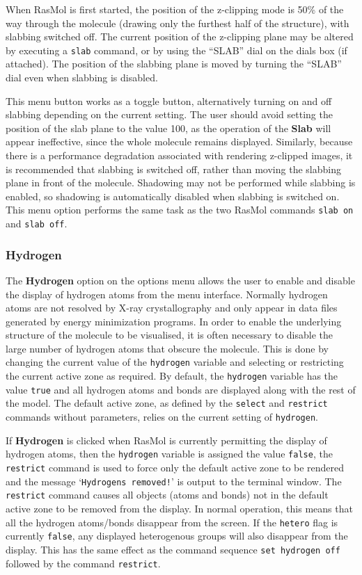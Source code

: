 When RasMol is first started, the position of the z-clipping mode is 50\% 
of the way through the molecule (drawing only the furthest half of the
structure), with slabbing switched off. The current position of the z-clipping
plane may be altered by executing a {\tt slab} command, or by using the
``SLAB'' dial on the dials box (if attached). The position of the slabbing
plane is moved by turning the ``SLAB'' dial even when slabbing is disabled.

This menu button works as a toggle button, alternatively turning on and off
slabbing depending on the current setting. The user should avoid setting the
position of the slab plane to the value 100, as the operation of the {\bf 
Slab} will appear ineffective, since the whole molecule remains displayed.
Similarly, because there is a performance degradation associated with 
rendering z-clipped images, it is recommended that slabbing is switched off, 
rather than moving the slabbing plane in front of the molecule. Shadowing may
not be performed while slabbing is enabled, so shadowing is automatically 
disabled when slabbing is switched on. This menu option performs the same 
task as the two RasMol commands {\tt slab~on} and {\tt slab~off}.

\subsubsection{Hydrogen}
\label{OHydrogen}
The {\bf Hydrogen} option on the options menu allows the user to enable
and disable the display of hydrogen atoms from the menu interface. Normally
hydrogen atoms are not resolved by X-ray crystallography and only appear
in data files generated by energy minimization programs. In order to enable
the underlying structure of the molecule to be visualised, it is often
necessary to disable the large number of hydrogen atoms that obscure the 
molecule. This is done by changing the current value of the {\tt hydrogen}
variable and selecting or restricting the current active zone as required.
By default, the {\tt hydrogen} variable has the value {\tt true} and all
hydrogen atoms and bonds are displayed along with the rest of the model.
The default active zone, as defined by the {\tt select} and {\tt restrict}
commands without parameters, relies on the current setting of {\tt hydrogen}.

If {\bf Hydrogen} is clicked when RasMol is currently permitting the
display of hydrogen atoms, then the {\tt hydrogen} variable is assigned the
value {\tt false}, the {\tt restrict} command is used to force only
the default active zone to be rendered and the message `{\tt Hydrogens
removed!}' is output to the terminal window. The {\tt restrict} command
causes all objects (atoms and bonds) not in the default active zone to be
removed from the display. In normal operation, this means that all the
hydrogen atoms/bonds disappear from the screen. If the {\tt hetero} flag
is currently {\tt false}, any displayed heterogenous groups will also 
disappear from the display. This has the same effect as the command 
sequence {\tt set~hydrogen~off} followed by the command {\tt restrict}.

